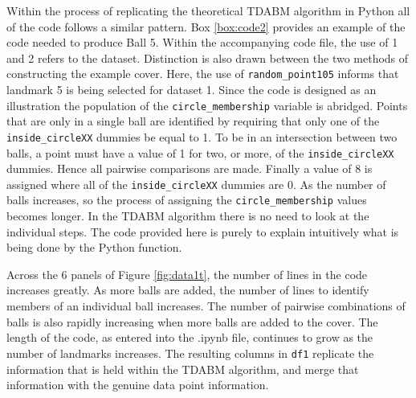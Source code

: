 \documentclass{article}
\begin{document}
Within the process of replicating the theoretical TDABM algorithm in Python all of the code follows a similar pattern. Box \ref{box:code2} provides an example of the code needed to produce Ball 5. Within the accompanying code file, the use of 1 and 2 refers to the dataset. Distinction is also drawn between the two methods of constructing the example cover. Here, the use of \texttt{random\_point105} informs that landmark 5 is being selected for dataset 1. Since the code is designed as an illustration the population of the \texttt{circle\_membership} variable is abridged. Points that are only in a single ball are identified by requiring that only one of the \texttt{inside\_circleXX} dummies be equal to 1. To be in an intersection between two balls, a point must have a value of 1 for two, or more, of the \texttt{inside\_circleXX} dummies. Hence all pairwise comparisons are made. Finally a value of 8 is assigned where all of the \texttt{inside\_circleXX} dummies are 0. As the number of balls increases, so the process of assigning the \texttt{circle\_membership} values becomes longer. In the TDABM algorithm there is no need to look at the individual steps. The code provided here is purely to explain intuitively what is being done by the Python function.

Across the 6 panels of Figure \ref{fig:data1t}, the number of lines in the code increases greatly. As more balls are added, the number of lines to identify members of an individual ball increases. The number of pairwise combinations of balls is also rapidly increasing when more balls are added to the cover. The length of the code, as entered into the .ipynb file, continues to grow as the number of landmarks increases. The resulting columns in \texttt{df1} replicate the information that is held within the TDABM algorithm, and merge that information with the genuine data point information.
	
\end{document}
